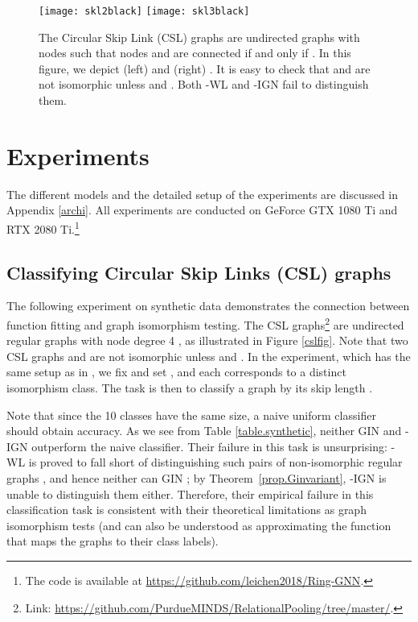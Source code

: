 \documentclass{article}
\begin{document}
\begin{figure}
    \label{cslfig}
    \centering
    \texttt{[image: skl2black]}
    \texttt{[image: skl3black]}
    \caption{The Circular Skip Link (CSL) graphs  are undirected graphs with  nodes such that nodes  and  are connected if and only if . In this figure, we depict (left)  and (right) . It is easy to check that  and  are not isomorphic unless  and . Both -WL and -IGN fail to distinguish them.}
    \label{fig.skiplength}
\end{figure}

\section{Experiments}
\label{experiments}
The different models and the detailed setup of the experiments are discussed in Appendix \ref{archi}. All experiments are conducted on GeForce GTX 1080 Ti and RTX 2080 Ti.\footnote{The code is available at  \url{https://github.com/leichen2018/Ring-GNN}.}

\subsection{Classifying Circular Skip Links (CSL) graphs}
\label{cslexp}
The following experiment on synthetic data demonstrates the connection between function fitting and graph isomorphism testing. The CSL graphs\footnote{Link: \url{https://github.com/PurdueMINDS/RelationalPooling/tree/master/}.} are undirected regular graphs with node degree 4 \cite{murphy2019relational}, as illustrated in Figure \ref{cslfig}. Note that two CSL graphs  and  are not isomorphic unless  and . In the experiment, which has the same setup as in \cite{murphy2019relational}, we fix  and set , and each  corresponds to a distinct isomorphism class. The task is then to classify a graph  by its skip length .

Note that since the 10 classes have the same size, a naive uniform classifier should obtain  accuracy. As we see from Table \ref{table.synthetic}, neither GIN and -IGN outperform the naive classifier. Their failure in this task is unsurprising: -WL is proved to fall short of distinguishing such pairs of non-isomorphic regular graphs \cite{cai1992optimal}, and hence neither can GIN \cite{xu2018powerful}; by Theorem~\ref{prop.Ginvariant}, -IGN is unable to distinguish them either. Therefore, their empirical failure in this classification task is consistent with their theoretical limitations as graph isomorphism tests (and can also be understood as approximating the function that maps the graphs to their class labels).
\end{document}
